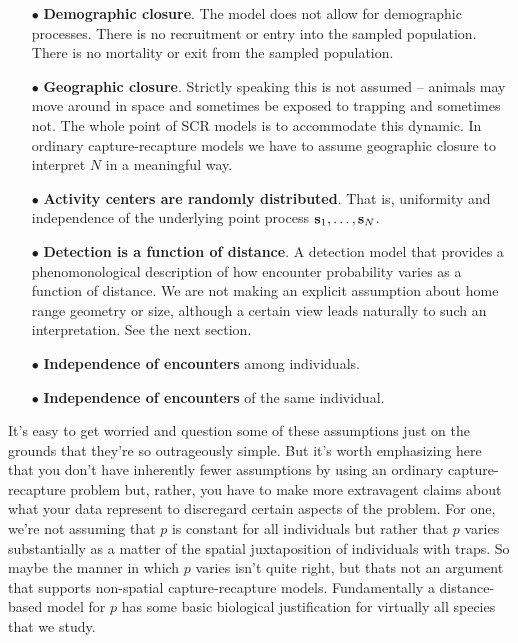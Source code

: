 \begin{itemize} 
\item[$\bullet$] {\bf Demographic closure}. The model does not allow for demographic processes.
There is no recruitment or entry into the sampled population. There is 
no mortality or exit from the sampled population.
\item[$\bullet$] {\bf Geographic closure}.
 Strictly speaking this is not assumed -- animals may move around in
 space and sometimes be exposed to trapping and sometimes not. The
 whole point of SCR models is to accommodate this dynamic. In ordinary
 capture-recapture models we have to assume geographic closure to interpret $N$ in a
 meaningful way. 
\item[$\bullet$] {\bf Activity centers are randomly distributed}. That
  is, uniformity and independence of the underlying point
  process ${\bf s}_{1},\ldots, {\bf s}_{N}$.
\item[$\bullet$] {\bf Detection is a function of distance}. 
A detection model that provides a phenomonological
  description of how encounter probability varies as a function of distance.
 We are not making an explicit assumption about home range geometry or
 size, although a certain view leads naturally to such an
 interpretation. See the next section. 
\item[$\bullet$] {\bf Independence of encounters} among individuals.
\item[$\bullet$] {\bf Independence of encounters} of the same individual.
\end{itemize}
It's easy to get worried and question some of these assumptions just on
the grounds that they're so outrageously simple. But it's worth
emphasizing here that you don't have inherently fewer assumptions by
using an ordinary capture-recapture problem but, rather, you have to
make more extravagent claims about what your data represent to
discregard certain aspects of the problem.  For one, we're not
assuming that $p$ is constant for all individuals but rather that $p$
varies substantially as a matter of the spatial juxtaposition of
individuals with traps. So maybe the manner in which $p$ varies isn't
quite right, but thats not an argument that supports non-spatial
capture-recapture models. 
 Fundamentally a
distance-based model for $p$ has some basic biological justification
for virtually all species that we study.

